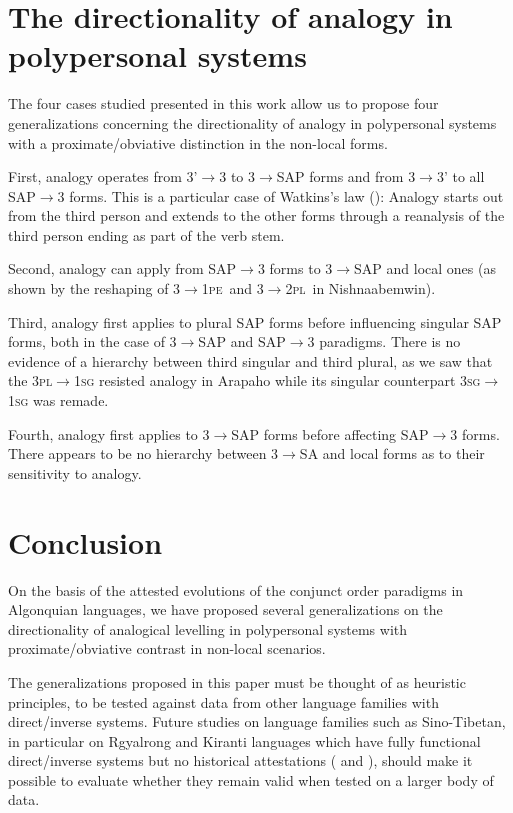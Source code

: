 \documentclass[twoside,a4paper,11pt]{article}
\newcommand{\sg}{\textsc{sg}}
\newcommand{\pl}{\textsc{pl}}
\newcommand{\Σ}{\greek{Σ}}
\newcommand{\pe}{\textsc{pe}}
\begin{document}
\section{The directionality of analogy in polypersonal systems}

The four cases studied presented in this work allow us to propose four generalizations concerning the directionality of analogy in polypersonal systems with a proximate/obviative distinction in the non-local forms.
 
First, analogy operates from 3'$\rightarrow$3 to 3$\rightarrow$SAP forms and from 3$\rightarrow$3' to all SAP$\rightarrow$3 forms. This is a particular case of   Watkins's law (\citealt{watkins62celtic}): Analogy starts out from the third person and extends to the other forms through a reanalysis of the third person ending as part of the verb stem.
 
Second, analogy can apply from SAP$\rightarrow$3 forms to 3$\rightarrow$SAP and  local ones (as shown by the reshaping of 3$\rightarrow$1\pe\ and 3$\rightarrow$2\pl\ in Nishnaabemwin).

Third,  analogy first applies to plural SAP forms before influencing singular SAP forms, both in the case of 3$\rightarrow$SAP and SAP$\rightarrow$3 paradigms. There is no evidence of a hierarchy between third singular and third plural, as we saw that the 3\pl{}$\rightarrow$1\sg{} resisted analogy in Arapaho while its singular counterpart 3\sg{}$\rightarrow$1\sg{} was remade.

Fourth, analogy first applies  to 3$\rightarrow$SAP forms before affecting SAP$\rightarrow$3 forms. There appears  to be no hierarchy between 3$\rightarrow$SA and local forms as to their sensitivity to analogy.

\section{Conclusion}

On the basis of the attested evolutions of the conjunct order paradigms in Algonquian languages, we have proposed several generalizations on the directionality of analogical levelling in polypersonal systems with proximate/obviative contrast in non-local scenarios. 

The generalizations proposed in this paper must be thought of as heuristic principles, to be tested against data from other language families with direct/inverse systems. Future studies on language families such as Sino-Tibetan, in particular on Rgyalrong and Kiranti languages which have fully functional direct/inverse systems but no historical attestations (\citealp{delancey81direction, jackson02rentongdengdi, gongxun14agreement} and \citealp{lai15person}), should make it possible to evaluate whether they remain valid when tested on a larger body of data.
\end{document}
